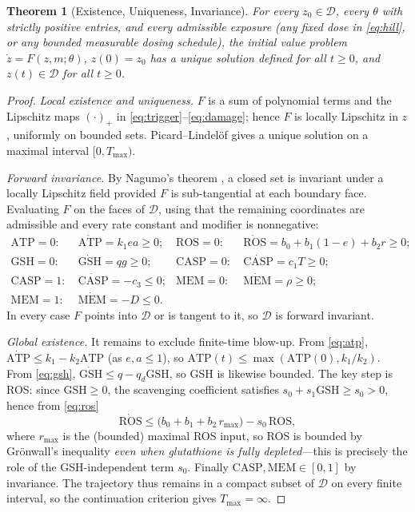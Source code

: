 \documentclass[journal]{IEEEtran}
\newtheorem{theorem}{Theorem}
\newcommand{\relu}[1]{(#1)_{+}}
\begin{document}
\begin{theorem}[Existence, Uniqueness, Invariance]
\label{thm:wellposed}
For every $z_0\in\mathcal{D}$, every $\theta$ with strictly positive entries, and
every admissible exposure (any fixed dose in \eqref{eq:hill}, or any bounded
measurable dosing schedule), the initial value problem $\dot z=F(z,m;\theta)$,
$z(0)=z_0$ has a unique solution defined for all $t\ge0$, and $z(t)\in\mathcal{D}$
for all $t\ge0$.
\end{theorem}

\begin{proof}
\emph{Local existence and uniqueness.} $F$ is a sum of polynomial terms and the
Lipschitz maps $\relu{\cdot}$ in \eqref{eq:trigger}--\eqref{eq:damage}; hence $F$
is locally Lipschitz in $z$, uniformly on bounded sets. Picard--Lindel\"of gives
a unique solution on a maximal interval $[0,T_{\max})$.

\emph{Forward invariance.} By Nagumo's theorem \cite{blanchini1999}, a closed set
is invariant under a locally Lipschitz field provided $F$ is sub-tangential at
each boundary face. Evaluating $F$ on the faces of $\mathcal{D}$, using that the
remaining coordinates are admissible and every rate constant and modifier is
nonnegative:
\begin{align*}
\mathrm{ATP}{=}0:&\ \dot{\mathrm{ATP}}=k_1 e a\ge0; &
\mathrm{ROS}{=}0:&\ \dot{\mathrm{ROS}}=b_0+b_1(1{-}e)+b_2 r\ge0;\\
\mathrm{GSH}{=}0:&\ \dot{\mathrm{GSH}}=q g\ge0; &
\mathrm{CASP}{=}0:&\ \dot{\mathrm{CASP}}=c_1 T\ge0;\\
\mathrm{CASP}{=}1:&\ \dot{\mathrm{CASP}}=-c_3\le0; &
\mathrm{MEM}{=}0:&\ \dot{\mathrm{MEM}}=\rho\ge0;\\
\mathrm{MEM}{=}1:&\ \dot{\mathrm{MEM}}=-D\le0. &&
\end{align*}
In every case $F$ points into $\mathcal{D}$ or is tangent to it, so $\mathcal{D}$
is forward invariant.

\emph{Global existence.} It remains to exclude finite-time blow-up. From
\eqref{eq:atp}, $\dot{\mathrm{ATP}}\le k_1 - k_2\mathrm{ATP}$ (as $e,a\le1$), so
$\mathrm{ATP}(t)\le\max(\mathrm{ATP}(0),k_1/k_2)$. From \eqref{eq:gsh},
$\dot{\mathrm{GSH}}\le q - q_d\mathrm{GSH}$, so GSH is likewise bounded. The key
step is ROS: since $\mathrm{GSH}\ge0$, the scavenging coefficient satisfies
$s_0+s_1\mathrm{GSH}\ge s_0>0$, hence from \eqref{eq:ros}
\[
\dot{\mathrm{ROS}}\le \big(b_0+b_1+b_2\,r_{\max}\big) - s_0\,\mathrm{ROS},
\]
where $r_{\max}$ is the (bounded) maximal ROS input, so ROS is bounded by
Gr\"onwall's inequality \emph{even when glutathione is fully depleted}---this is
precisely the role of the GSH-independent term $s_0$. Finally
$\mathrm{CASP},\mathrm{MEM}\in[0,1]$ by invariance. The trajectory thus remains in
a compact subset of $\mathcal{D}$ on every finite interval, so the continuation
criterion \cite{khalil2002} gives $T_{\max}=\infty$.
\end{proof}
\end{document}
